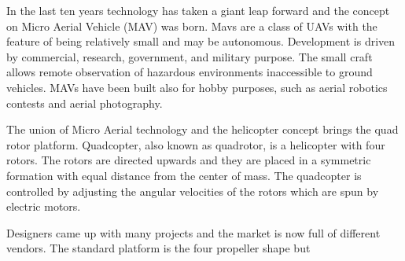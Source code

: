 \noindent
In the last ten years technology has taken a giant leap forward and the concept on Micro Aerial Vehicle (MAV) was born. Mavs are a class of UAVs with the feature of being relatively small and may be autonomous. Development is driven by commercial, research, government, and military purpose. The small craft allows remote observation of hazardous environments inaccessible to ground vehicles. MAVs have been built also for hobby purposes, such as aerial robotics contests and aerial photography.\par The union of Micro Aerial technology and the helicopter concept brings the quad rotor platform. Quadcopter, also known as quadrotor, is a helicopter with four rotors. The rotors are directed upwards and they are placed in a symmetric formation with equal distance from the center of mass. The quadcopter is controlled by adjusting the angular velocities of the rotors which are spun by electric motors.\par Designers came up with many projects and the market is now full of different vendors. The standard platform is the four propeller shape but
